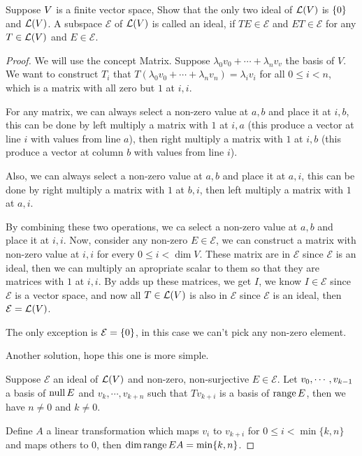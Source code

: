 \documentclass[../main.tex]{subfiles}
\begin{document}
\begin{exercise}
  Suppose $\mathnormal{V}$ is a finite vector space, Show that the only two ideal of
  $\mathcal{L}(\mathnormal{V})$ is $\{0\}$ and $\mathcal{L}(\mathnormal{V})$.
  A subspace $\mathcal{E}$ of $\mathcal{L}(\mathnormal{V})$ is called an ideal, 
  if $TE \in \mathcal{E}$ and $ET \in \mathcal{E}$
  for any $T \in \mathcal{L}(\mathnormal{V})$ and $E \in \mathcal{E}$.
\end{exercise}
\begin{proof}
  We will use the concept Matrix.
  Suppose $\lambda_0v_0 + \cdots + \lambda_nv_v$ the basis of $V$.
  We want to construct $T_i$ that $T(\lambda_0v_0 + \cdots + \lambda_nv_n) = \lambda_iv_i$ for all $0 \le i < n$,
  which is a matrix with all zero but $1$ at $i, i$.

  For any matrix, we can always select a non-zero value at $a, b$ and place it at $i, b$,
  this can be done by left multiply a matrix with $1$ at $i, a$
  (this produce a vector at line $i$ with values from line $a$),
  then right multiply a matrix with $1$ at $i, b$
  (this produce a vector at column $b$ with values from line $i$).

  Also, we can always select a non-zero value at $a, b$ and place it at $a, i$,
  this can be done by right multiply a matrix with $1$ at $b, i$,
  then left multiply a matrix with $1$ at $a, i$.

  By combining these two operations, we ca select a non-zero value at $a, b$ and place it at $i, i$.
  Now, consider any non-zero $E \in \mathcal{E}$, we can construct a
  matrix with non-zero value at $i, i$ for every $0 \le i < \dim V$. These matrix
  are in $\mathcal{E}$ since $\mathcal{E}$ is an ideal, then we can multiply an apropriate scalar
  to them so that they are matrices with $1$ at $i, i$. By adds up these matrices, we get $I$,
  we know $I \in \mathcal{E}$ since $\mathcal{E}$ is a vector space, and now all $T \in \mathcal{L}(V)$
  is also in $\mathcal{E}$ since $\mathcal{E}$ is an ideal, then $\mathcal{E} = \mathcal{L}(V)$.

  The only exception is $\mathcal{E} = \{0\}$, in this case we can't pick any non-zero element.

  Another solution, hope this one is more simple.

  Suppose $\mathcal{E}$ an ideal of $\mathcal{L}(V)$ and non-zero, non-surjective $E \in \mathcal{E}$.
  Let $v_0 , \cdots , v_{k - 1}$ a basis of $\operatorname{null} E$ and $v_k, \cdots, v_{k + n}$ such that $Tv_{k + i}$
  is a basis of $\operatorname{range} E$, then we have $n \neq 0$ and $k \neq 0$.

  Define $A$ a linear transformation which maps $v_i$ to $v_{k + i}$ for $0 \le i < \min\{k, n\}$ and maps others to $0$,
  then $\dim \operatorname{range} EA = \min\{k, n\}$.


\end{proof}
\end{document}
